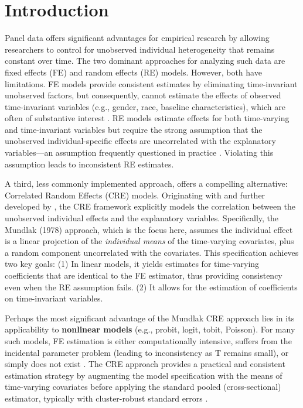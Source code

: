 \documentclass[bib]{statapress}
\begin{document}
\section{Introduction}\label{introduction}

Panel data offers significant advantages for empirical research by
allowing researchers to control for unobserved individual heterogeneity
that remains constant over time. The two dominant approaches for
analyzing such data are fixed effects (FE) and random effects (RE)
models. However, both have limitations. FE models provide consistent
estimates by eliminating time-invariant unobserved factors, but
consequently, cannot estimate the effects of observed time-invariant
variables (e.g., gender, race, baseline characteristics), which are
often of substantive interest \citep{wooldridge2010econometric}. RE
models estimate effects for both time-varying and time-invariant
variables but require the strong assumption that the unobserved
individual-specific effects are uncorrelated with the explanatory
variables---an assumption frequently questioned in practice
\citep{wooldridge2019}. Violating this assumption leads to inconsistent
RE estimates.

A third, less commonly implemented approach, offers a compelling
alternative: Correlated Random Effects (CRE) models. Originating with
\citet{mundlak1978pooling} and further developed by
\citet{chamberlain1982multivariate}, the CRE framework explicitly models
the correlation between the unobserved individual effects and the
explanatory variables. Specifically, the Mundlak (1978) approach, which
is the focus here, assumes the individual effect is a linear projection
of the \emph{individual means} of the time-varying covariates, plus a
random component uncorrelated with the covariates. This specification
achieves two key goals: (1) In linear models, it yields estimates for
time-varying coefficients that are identical to the FE estimator, thus
providing consistency even when the RE assumption fails. (2) It allows
for the estimation of coefficients on time-invariant variables.

Perhaps the most significant advantage of the Mundlak CRE approach lies
in its applicability to \textbf{nonlinear models} (e.g., probit, logit,
tobit, Poisson). For many such models, FE estimation is either
computationally intensive, suffers from the incidental parameter problem
(leading to inconsistency as T remains small), or simply does not exist
\citep{wooldridge2019}. The CRE approach provides a practical and
consistent estimation strategy by augmenting the model specification
with the means of time-varying covariates before applying the standard
pooled (cross-sectional) estimator, typically with cluster-robust
standard errors \citep{wooldridge2010econometric, wooldridge2019}.
\end{document}
